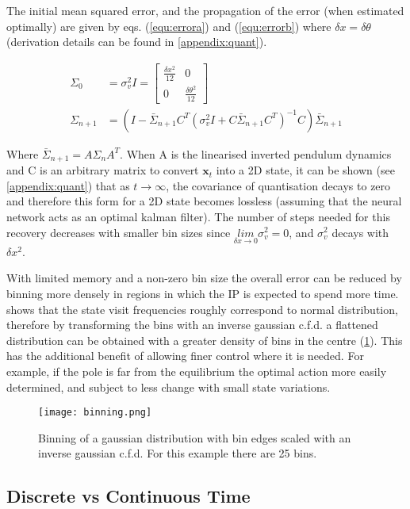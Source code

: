 \documentclass[../main.tex]{subfiles}
\begin{document}
The initial mean squared error, and the propagation of the error (when estimated optimally) are given by eqs. (\ref{equ:errora}) and (\ref{equ:errorb}) where $\delta x = \delta \theta$ (derivation details can be found in \cref{appendix:quant}).

\begin{align}
   \Sigma_0 &= \sigma_v^2 I = \begin{bmatrix} \frac{\delta x^2}{12} & 0 \\ 0 & \frac{\delta \theta^2}{12} \end{bmatrix}\label{equ:errora}\\
      \Sigma_{n+1} &= (I - \bar{\Sigma}_{n+1}C^T (\sigma_v^2 I + C \bar{\Sigma}_{n+1} C^T)^{-1} C)\bar{\Sigma}_{n+1} \label{equ:errorb}
\end{align}

Where $\bar{\Sigma}_{n+1} = A \Sigma_n A^T$. When A is the linearised inverted pendulum dynamics and C is an arbitrary matrix to convert $\boldsymbol{x}_t$ into a 2D state, it can be shown (see \cref{appendix:quant}) that as $t \rightarrow \infty$, the covariance of quantisation decays to zero and therefore this form for a 2D state becomes lossless (assuming that the neural network acts as an optimal kalman filter). The number of steps needed for this recovery decreases with smaller bin sizes since $\underset{\delta x \rightarrow 0}{lim} \sigma_v^2 = 0$, and $\sigma_v^2$ decays with $\delta x^2$. 

With limited memory and a non-zero bin size the overall error can be reduced by binning more densely in regions in which the IP is expected to spend more time.  shows that the state visit frequencies roughly correspond to normal distribution, therefore by transforming the bins with an inverse gaussian c.f.d. a flattened distribution can be obtained with a greater density of bins in the centre (\cref{fig:binning}). This has the additional benefit of allowing finer control where it is needed. For example, if the pole is far from the equilibrium the optimal action more easily determined, and subject to less change with small state variations.

\begin{figure}[h]
   \centering
   \texttt{[image: binning.png]}
   \caption{Binning of a gaussian distribution with bin edges scaled with an inverse gaussian c.f.d. For this example there are 25 bins.}
   \label{fig:binning}
\end{figure}

\subsection{Discrete vs Continuous Time}
\end{document}
